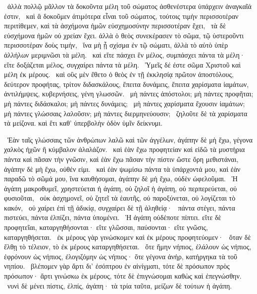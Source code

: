 ~ἀλλὰ πολλῷ μᾶλλον τὰ δοκοῦντα μέλη τοῦ σώματος ἀσθενέστερα ὑπάρχειν ἀναγκαῖά ἐστιν,
~καὶ ἃ δοκοῦμεν ἀτιμότερα εἶναι τοῦ σώματος, τούτοις τιμὴν περισσοτέραν περιτίθεμεν, καὶ τὰ ἀσχήμονα ἡμῶν εὐσχημοσύνην περισσοτέραν ἔχει,
~τὰ δὲ εὐσχήμονα ἡμῶν οὐ χρείαν ἔχει. ἀλλὰ ὁ θεὸς συνεκέρασεν τὸ σῶμα, τῷ ὑστεροῦντι περισσοτέραν δοὺς τιμήν,
~ἵνα μὴ ᾖ σχίσμα ἐν τῷ σώματι, ἀλλὰ τὸ αὐτὸ ὑπὲρ ἀλλήλων μεριμνῶσι τὰ μέλη.
~καὶ εἴτε πάσχει ἓν μέλος, συμπάσχει πάντα τὰ μέλη· εἴτε δοξάζεται μέλος, συγχαίρει πάντα τὰ μέλη.
~Ὑμεῖς δέ ἐστε σῶμα Χριστοῦ καὶ μέλη ἐκ μέρους.
~καὶ οὓς μὲν ἔθετο ὁ θεὸς ἐν τῇ ἐκκλησίᾳ πρῶτον ἀποστόλους, δεύτερον προφήτας, τρίτον διδασκάλους, ἔπειτα δυνάμεις, ἔπειτα χαρίσματα ἰαμάτων, ἀντιλήμψεις, κυβερνήσεις, γένη γλωσσῶν.
~μὴ πάντες ἀπόστολοι; μὴ πάντες προφῆται; μὴ πάντες διδάσκαλοι; μὴ πάντες δυνάμεις;
~μὴ πάντες χαρίσματα ἔχουσιν ἰαμάτων; μὴ πάντες γλώσσαις λαλοῦσιν; μὴ πάντες διερμηνεύουσιν;
~ζηλοῦτε δὲ τὰ χαρίσματα τὰ μείζονα. καὶ ἔτι καθ’ ὑπερβολὴν ὁδὸν ὑμῖν δείκνυμι.

~Ἐὰν ταῖς γλώσσαις τῶν ἀνθρώπων λαλῶ καὶ τῶν ἀγγέλων, ἀγάπην δὲ μὴ ἔχω, γέγονα χαλκὸς ἠχῶν ἢ κύμβαλον ἀλαλάζον.
~καὶ ἐὰν ἔχω προφητείαν καὶ εἰδῶ τὰ μυστήρια πάντα καὶ πᾶσαν τὴν γνῶσιν, καὶ ἐὰν ἔχω πᾶσαν τὴν πίστιν ὥστε ὄρη μεθιστάναι, ἀγάπην δὲ μὴ ἔχω, οὐθέν εἰμι.
~καὶ ἐὰν ψωμίσω πάντα τὰ ὑπάρχοντά μου, καὶ ἐὰν παραδῶ τὸ σῶμά μου, ἵνα καυθήσομαι, ἀγάπην δὲ μὴ ἔχω, οὐδὲν ὠφελοῦμαι.
~Ἡ ἀγάπη μακροθυμεῖ, χρηστεύεται ἡ ἀγάπη, οὐ ζηλοῖ ἡ ἀγάπη, οὐ περπερεύεται, οὐ φυσιοῦται,
~οὐκ ἀσχημονεῖ, οὐ ζητεῖ τὰ ἑαυτῆς, οὐ παροξύνεται, οὐ λογίζεται τὸ κακόν,
~οὐ χαίρει ἐπὶ τῇ ἀδικίᾳ, συγχαίρει δὲ τῇ ἀληθείᾳ·
~πάντα στέγει, πάντα πιστεύει, πάντα ἐλπίζει, πάντα ὑπομένει.
~Ἡ ἀγάπη οὐδέποτε πίπτει. εἴτε δὲ προφητεῖαι, καταργηθήσονται· εἴτε γλῶσσαι, παύσονται· εἴτε γνῶσις, καταργηθήσεται.
~ἐκ μέρους γὰρ γινώσκομεν καὶ ἐκ μέρους προφητεύομεν·
~ὅταν δὲ ἔλθῃ τὸ τέλειον, τὸ ἐκ μέρους καταργηθήσεται.
~ὅτε ἤμην νήπιος, ἐλάλουν ὡς νήπιος, ἐφρόνουν ὡς νήπιος, ἐλογιζόμην ὡς νήπιος· ὅτε γέγονα ἀνήρ, κατήργηκα τὰ τοῦ νηπίου.
~βλέπομεν γὰρ ἄρτι δι’ ἐσόπτρου ἐν αἰνίγματι, τότε δὲ πρόσωπον πρὸς πρόσωπον· ἄρτι γινώσκω ἐκ μέρους, τότε δὲ ἐπιγνώσομαι καθὼς καὶ ἐπεγνώσθην.
~νυνὶ δὲ μένει πίστις, ἐλπίς, ἀγάπη· τὰ τρία ταῦτα, μείζων δὲ τούτων ἡ ἀγάπη.

